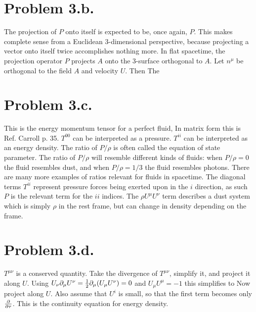 \documentclass{article}
\begin{document}
\section*{Problem 3.b.}
The projection of $P$ onto itself is expected to be, once again, $P$. This makes complete sense from a Euclidean 3-dimensional perspective, because projecting a vector onto itself twice accomplishes nothing more. In flat spacetime, the projection operator $P$ projects $A$ onto the 3-surface orthogonal to $A$. Let $n^\mu$ be orthogonal to the field $A$ and velocity $U$. Then
The 
\section*{Problem 3.c.}
This is the energy momentum tensor for a perfect fluid,
In matrix form this is
Ref. Carroll p. 35. $T^{00}$ can be interpreted as a pressure. $T^{ii}$ can be interpreted as an energy density. The ratio of $P/\rho$ is often called the equation of state parameter. The ratio of $P/\rho$ will resemble different kinds of fluids: when $P/\rho=0$ the fluid resembles dust, and when $P/\rho=1/3$ the fluid resembles photons. There are many more examples of ratios relevant for fluids in spacetime. The diagonal terms $T^{ii}$ represent pressure forces being exerted upon in the $i$ direction, as such $P$ is the relevant term for the $ii$ indices. The $\rho U^\mu U^\nu$ term describes a dust system which is simply $\rho$ in the rest frame, but can change in density depending on the frame.
\section*{Problem 3.d.}
$T^{\mu\nu}$ is a conserved quantity. Take the divergence of $T^{\mu\nu}$, simplify it, and project it along $U$.
Using $U_\nu \partial_\mu U^\nu = \frac{1}{2} \partial_\mu (U_\mu U^\nu) = 0$ and $U_\mu U^\mu=-1$ this simplifies to
Now project along $U$. Also assume that $U^i$ is small, so that the first term becomes only $\frac{\partial}{\partial \tau}$.
This is the continuity equation for energy density.
\end{document}

